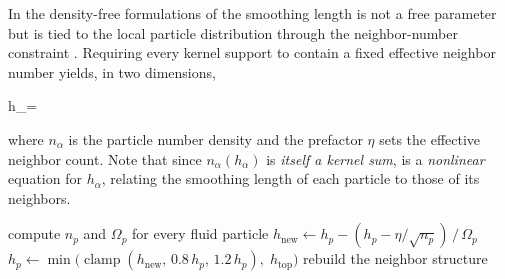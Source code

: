 \documentclass[../main.tex]{subfiles}
\begin{document}
In the density-free formulations of  the smoothing length is not a free parameter but is tied to the local particle distribution through the neighbor-number constraint  \autocite{hopkinsGeneralClassLagrangian2013a}. Requiring every kernel support to contain a fixed effective neighbor number yields, in two dimensions,

\begin{equations}[single,!,numberline=all]
\label{eq:H-CONSTRAINT-2D}
h_\alpha =  \eqcomma
\end{equations}

where $n_\alpha$ is the particle number density  and the prefactor $\eta$ sets the effective neighbor count. Note that since $n_\alpha\left(h_{\alpha}\right)$ is \emph{itself a kernel sum},  is a \emph{nonlinear} equation for $h_\alpha$, relating the smoothing length of each particle to those of its neighbors.

\begin{algorithm}
	\caption{Adaptive smoothing length. A fixed number of Newton iterations of the nonlinear neighbor-number constraint, performed once per each time step.}
	\label{alg:H-ADAPT}
	\begin{algobox}
	\begin{algorithmic}[1]
			 
				\State compute $n_p$ and $\Omega_p$ for every fluid particle 
						\State $h_{\text{new}} \gets h_p - (h_p - \eta/\sqrt{n_p})\,/\,\Omega_p$ 
						\State $h_p \gets \min\!\big(\operatorname{clamp}(h_{\text{new}},\, 0.8\,h_p,\, 1.2\,h_p),\; h_{\text{top}}\big)$ 
					\EndFor
					\State rebuild the neighbor structure
				\EndIf
			\EndFor
		\EndProcedure
	\end{algorithmic}
	\end{algobox}
\end{algorithm}
\end{document}
